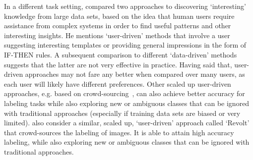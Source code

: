 %
In a different task setting, \citet{Freitas2006-qo} compared two approaches to discovering `interesting' knowledge from large data sets, based on the idea that human users require assistance from complex systems in order to find useful patterns and other interesting insights. He mentions `user-driven' methods that involve a user suggesting interesting templates or providing general impressions in the form of IF-THEN rules. A subsequent comparison to different `data-driven' methods suggests that the latter are not very effective in practice. 
Having said that, user-driven approaches may not fare any better when compared over many users, as each user will likely have different preferences. Other scaled up user-driven approaches, e.g. based on crowd-sourcing~\citet{Chang2017-kl}, can also achieve better accuracy for labeling tasks while also exploring new or ambiguous classes that can be ignored with traditional approaches (especially if training data sets are biased or very limited). \citet{Chang2017-kl} also consider a similar, scaled up, `user-driven' approach called `Revolt' that crowd-sources the labeling of images. It is able to attain high accuracy labeling, while also exploring new or ambiguous classes that can be ignored with traditional approaches. 

